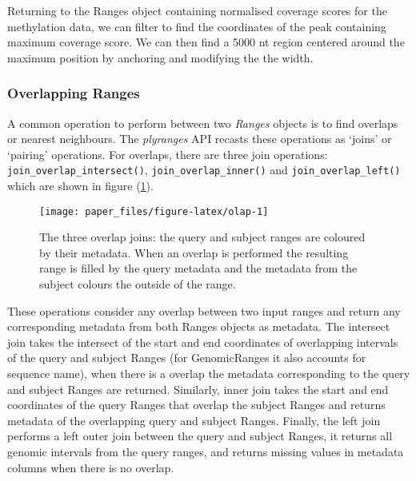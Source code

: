 \documentclass[10pt,letterpaper]{article}
\newenvironment{Shaded}{\begin{snugshade}}{\end{snugshade}}
\newcommand{\DecValTok}[1]{\textcolor[rgb]{0.00,0.00,0.81}{#1}}
\newcommand{\KeywordTok}[1]{\textcolor[rgb]{0.13,0.29,0.53}{\textbf{#1}}}
\newcommand{\NormalTok}[1]{#1}
\newcommand{\OperatorTok}[1]{\textcolor[rgb]{0.81,0.36,0.00}{\textbf{#1}}}
\newcommand{\StringTok}[1]{\textcolor[rgb]{0.31,0.60,0.02}{#1}}
\begin{document}
Returning to the Ranges object containing normalised coverage scores for
the methylation data, we can filter to find the coordinates of the peak
containing maximum coverage score. We can then find a 5000 nt region
centered around the maximum position by anchoring and modifying the the
width.

\begin{Shaded}
\end{Shaded}

\hypertarget{overlapping-ranges}{%
\subsubsection{Overlapping Ranges}\label{overlapping-ranges}}

A common operation to perform between two \emph{Ranges} objects is to
find overlaps or nearest neighbours. The \emph{plyranges} API recasts
these operations as `joins' or `pairing' operations. For overlaps, there
are three join operations: \texttt{join\_overlap\_intersect()},
\texttt{join\_overlap\_inner()} and \texttt{join\_overlap\_left()} which
are shown in figure (\ref{fig:olap}).

\begin{figure}

{\centering \texttt{[image: paper\_files/figure-latex/olap-1]} 

}

\caption{The three overlap joins: the query and subject ranges are coloured by their metadata. When an overlap is performed the resulting range is filled by the query metadata and the metadata from the subject colours the outside of the range.}\label{fig:olap}
\end{figure}

These operations consider any overlap between two input ranges and
return any corresponding metadata from both Ranges objects as metadata.
The intersect join takes the intersect of the start and end coordinates
of overlapping intervals of the query and subject Ranges (for
GenomicRanges it also accounts for sequence name), when there is a
overlap the metadata corresponding to the query and subject Ranges are
returned. Similarly, inner join takes the start and end coordinates of
the query Ranges that overlap the subject Ranges and returns metadata of
the overlapping query and subject Ranges. Finally, the left join
performs a left outer join between the query and subject Ranges, it
returns all genomic intervals from the query ranges, and returns missing
values in metadata columns when there is no overlap.
\end{document}
